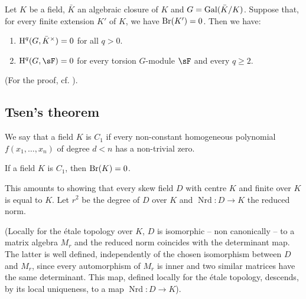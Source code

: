 \begin{proposition}\label{I:3-1-6}
Let $K$ be a field, $\bar K$ an algebraic closure of $K$ and
$G=\operatorname{Gal}(\bar K/K)$. Suppose that, for every finite extension $K'$ of $K$, we
have $\operatorname{Br}(K')=0$. Then we have:
\begin{enumerate}[\indent i)]
  \item $\operatorname{H}^q(G,\bar K^\times) = 0$ for all $q>0$.
  \item $\h^q(G,\sF) = 0$ for every torsion $G$-module $\sF$ and every
    $q\geqslant 2$.
\end{enumerate}
\end{proposition}

(For the proof, cf. \cite{se94}).










\subsection{Tsen's theorem}\label{I:3-2}





\begin{definition}\label{I:3-2-1}
We say that a field $K$ is $C_1$ if every non-constant homogeneous
polynomial $f(x_1,\dotsc,x_n)$ of degree $d<n$ has a non-trivial zero.
\end{definition}





\begin{proposition}\label{I:3-2-2}
If a field $K$ is $C_1$, then $\operatorname{Br}(K)=0$.
\end{proposition}

This amounts to showing that every skew field $D$ with centre $K$ and finite
over $K$ is equal to $K$. Let $r^2$ be the degree of $D$ over $K$ and
$\operatorname{Nrd}:D\to K$ the reduced norm.

(Locally for the \'etale topology over $K$, $D$ is isomorphic -- non
canonically -- to a matrix algebra $M_r$ and the reduced norm
coincides with the determinant map. The latter is well defined,
independently of the chosen isomorphism between $D$ and $M_r$, since every
automorphism of $M_r$ is inner and two similar matrices have the
same determinant. This map, defined locally for the
\'etale topology, descends, by its local uniqueness, to a
map $\operatorname{Nrd}:D\to K$).

